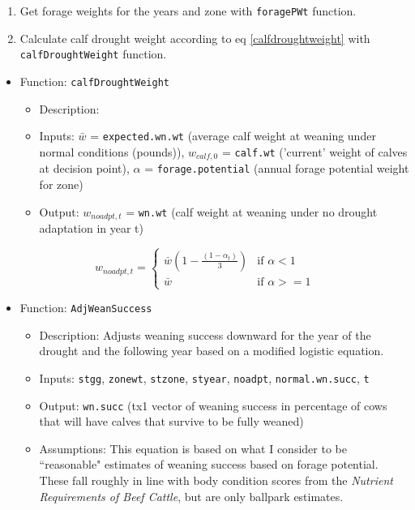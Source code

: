 \documentclass[11pt]{article}
\begin{document}
\begin{enumerate}
\item Get forage weights for the years and zone with \verb!foragePWt! function.
\item Calculate calf drought weight according to eq \ref{calfdroughtweight} with \verb!calfDroughtWeight! function.
\end{enumerate}



\begin{itemize}
\item Function: \verb!calfDroughtWeight!
	\begin{itemize}
	\item Description:
	\item Inputs: $\bar{w}$ = \verb!expected.wn.wt! (average calf weight at weaning under normal conditions (pounds)), $w_{calf, 0}$ = \verb!calf.wt! ('current' weight of calves at decision point), $\alpha$ = \verb!forage.potential! (annual forage potential weight for zone)
	\item Output: $w_{noadpt, t}$ = \verb!wn.wt! (calf weight at weaning under no drought adaptation in year t)
	\end{itemize}
\end{itemize}
\begin{equation} \label{calfdroughtweight}
w_{noadpt, t} = 
\begin{cases}
\bar{w} \left(1 - \frac{(1 - \alpha_t)}{3}\right) & \text{if } \alpha < 1 \\
\bar{w} & \text{if } \alpha >= 1
\end{cases}
\end{equation}

\begin{itemize}
\item Function: \verb!AdjWeanSuccess!
	\begin{itemize}
	\item Description: Adjusts weaning success downward for the year of the drought and the following year based on a modified logistic equation. 
	\item Inputs: \verb!stgg!, \verb!zonewt!, \verb!stzone!, \verb!styear!, \verb!noadpt!, \verb!normal.wn.succ!, \verb!t!
	\item Output: \verb!wn.succ! (tx1 vector of weaning success in percentage of cows that will have calves that survive to be fully weaned)
	\item Assumptions: This equation is based on what I consider to be ``reasonable" estimates of weaning success based on forage potential. These fall roughly in line with body condition scores from the \textit{Nutrient Requirements of Beef Cattle}, but are only ballpark estimates.
	\end{itemize}
\end{itemize}
\end{document}
